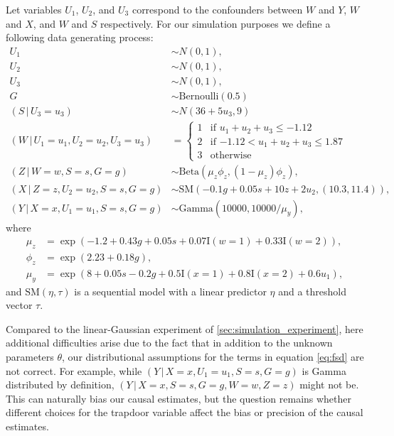 \documentclass[11pt,a4paper,twoside]{article}
\newcommand{\+}[1]{\ensuremath{\mathbf{#1}}}
\newcommand{\given}{{ \, | \, }}
\begin{document}
    Let variables $U_1$, $U_2$, and $U_3$ correspond to the confounders between $W$ and $Y$, $W$ and $X$, and $W$ and $S$ respectively. For our simulation purposes we define a following data generating process:
	\begin{equation*}
	\label{eq:nongaussian}
	\begin{aligned}
	U_1 &\sim N(0, 1),\\
	U_2 &\sim N(0, 1),\\
	U_3 &\sim N(0, 1),\\
	G &\sim \text{Bernoulli}(0.5)\\
	(S \given U_3 = u_3) & \sim N(36 + 5 u_3, 9)\\
	(W \given U_1 = u_1, U_2 = u_2, U_3 = u_3) &=  \begin{cases}
	1 & \text{if $u_1 + u_2 + u_3 \leq -1.12$}\\
	2 & \text{if $-1.12 < u_1 + u_2 + u_3 \leq 1.87$}\\
	3 & \text{otherwise}
	\end{cases}\\
	(Z \given W = w, S = s, G = g) &\sim \text{Beta}(\mu_z \phi_z, (1 - \mu_z)\phi_z),\\
	(X \given Z = z, U_2 = u_2, S = s, G = g) &\sim \text{SM}(-0.1 g + 0.05 s + 10 z + 2 u_2, (10.3, 11.4)),\\
	(Y \given X = x, U_1 = u_1, S = s, G = g) &\sim \text{Gamma}(10000, 10000 / \mu_y),
	\end{aligned}
	\end{equation*}
	where 
	\begin{equation*}
	\begin{aligned}
	\mu_z &= \exp(-1.2 + 0.43 g + 0.05 s + 0.07  \textrm{I}(w = 1) + 0.33 \textrm{I}(w = 2)), \\
	\phi_z &= \exp(2.23 + 0.18 g), \\
	\mu_y &= \exp(8 + 0.05 s - 0.2 g + 0.5 \textrm{I}(x = 1) + 0.8 \textrm{I}(x = 2) + 0.6 u_1),
	\end{aligned}
	\end{equation*}
	 and $\text{SM}(\eta, \tau)$ is a sequential model \citep{Tutz1990, burkner2019} with a linear predictor $\eta$ and a threshold vector $\tau$.

	Compared to the linear-Gaussian experiment of \autoref{sec:simulation_experiment}, here additional difficulties arise due to the fact that in addition to the unknown parameters $\theta$, our distributional assumptions for the terms in equation \eqref{eq:fsd} are not correct. For example, while $(Y \given X = x, U_1 = u_1, S = s, G = g)$ is Gamma distributed by definition, $(Y \given X = x, S = s, G = g, W = w, Z = z)$ might not be. This can naturally bias our causal estimates, but the question remains whether different choices for the trapdoor variable affect the bias or precision of the causal estimates.
	
\end{document}
